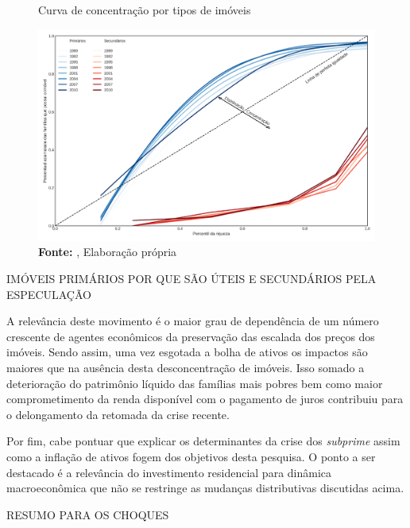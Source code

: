 
\begin{figure}[H]
	\centering
	\caption{Curva de concentração por tipos de imóveis}
	\label{FigConcentracao}
	\includegraphics[width=\textwidth]{../../Dados/Fatos_Estilizados/figs/Concentracao_Imoveis.png}
	\caption*{\textbf{Fonte:} \textcite{us_census_bureau_characteristics_2017}, Elaboração própria}
\end{figure}


IMÓVEIS PRIMÁRIOS POR QUE SÃO ÚTEIS E SECUNDÁRIOS PELA ESPECULAÇÃO

A relevância deste movimento é o maior grau de dependência de um número crescente de agentes econômicos da preservação das escalada dos preços dos imóveis.
Sendo assim, uma vez esgotada a bolha de ativos os impactos são maiores que na ausência desta desconcentração de imóveis.
Isso somado a deterioração do patrimônio líquido das famílias mais pobres bem como maior comprometimento da renda disponível com o pagamento de juros contribuiu para o delongamento da retomada da crise recente.

Por fim, cabe pontuar que explicar os determinantes da crise dos \textit{subprime} assim como a inflação de ativos fogem dos objetivos desta pesquisa.
O ponto a ser destacado é a relevância do investimento residencial para dinâmica macroeconômica que não se restringe as mudanças distributivas discutidas acima.


RESUMO PARA OS CHOQUES

